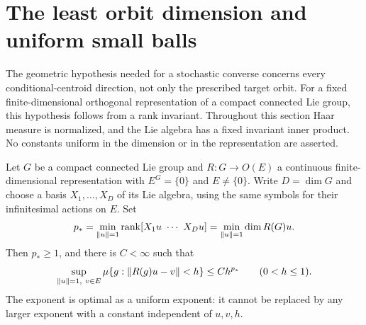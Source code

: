 \section{The least orbit dimension and uniform small balls}\label{sec:minorbits58}
The geometric hypothesis needed for a stochastic converse concerns every
conditional-centroid direction, not only the prescribed target orbit.
For a fixed finite-dimensional orthogonal representation of a compact
connected Lie group, this hypothesis follows from a rank invariant.
Throughout this section Haar measure is normalized, and the Lie algebra
has a fixed invariant inner product. No constants uniform in the dimension
or in the representation are asserted.

\begin{theorem}
\label{thm:minorbit58}
Let $G$ be a compact connected Lie group and $R:G\to O(E)$ a continuous
finite-dimensional representation with $E^G=\{0\}$ and $E\ne\{0\}$.
Write $D=\dim G$ and choose a basis $X_1,\ldots,X_D$ of its Lie algebra,
using the same symbols for their infinitesimal actions on $E$. Set
\begin{equation}\label{eq:minrank58}
 p_* =\min_{\lVert u\rVert=1}\operatorname{rank}
       [X_1u\ \cdots\ X_Du]
     =\min_{\lVert u\rVert=1}\dim R(G)u.
\end{equation}
Then $p_*\ge1$, and there is $C<\infty$ such that
\begin{equation}\label{eq:mincap58}
 \sup_{\lVert u\rVert=1,\ v\in E}
 \mu\{g:\lVert R(g)u-v\rVert<h\}\le C h^{p_*}
                 \qquad(0<h\le1).
\end{equation}
The exponent is optimal as a uniform exponent: it cannot be replaced by
any larger exponent with a constant independent of $u,v,h$.
\end{theorem}
